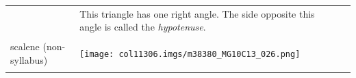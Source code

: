 \begin{table}[H]
\begin{center}
\begin{xtabular*}{\mytablewidth}[t]{|p{10\mystarwidth}|p{10\mystarwidth}|p{10\mystarwidth}|}
\begin{center}
      \vspace{2pt}
    \vspace{.1in}
    
    \end{center}



    \addtocounter{footnote}{-0}
    
                 &
    
    
        This triangle has one right angle. The side opposite this angle is called the \textsl{hypotenuse}.%
     \tabularnewline{}
    
    
        scalene (non-syllabus) &
    
    
        
                  
    \setcounter{subfigure}{0}

\label{m38380*id317668}
    \begin{center}
    \label{m38380*id317668!!!underscore!!!media}\label{m38380*id317668!!!underscore!!!printimage}\texttt{[image: col11306.imgs/m38380\_MG10C13\_026.png]} %
        
      \vspace{2pt}
    \vspace{.1in}
    
    \end{center}



    \addtocounter{footnote}{-0}
    
                 &
    
    

\end{xtabular*}
\end{center}
\end{table}
